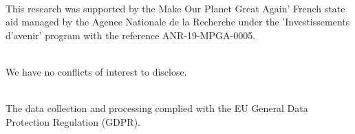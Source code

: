 \documentclass{article}
\begin{document}
 \\
This research was supported by the Make Our Planet Great Again’ French state aid managed by the Agence Nationale de la Recherche under the ’Investissements d’avenir’ program with the reference ANR-19-MPGA-0005. \bigskip

 \\
We have no conflicts of interest to disclose. \bigskip

 \\
The data collection and processing complied with the EU General Data Protection Regulation (GDPR).
\end{document}

